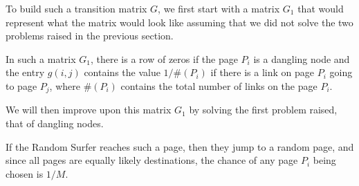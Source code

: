 \documentclass[pdftex,11pt,a4paper]{report}
\begin{document}
To build such a transition matrix $G$, we first start with a matrix $G_1$ that would represent
what the matrix would look like assuming that we did not solve the two problems raised in the
previous section. 


%

In such a matrix $G_1$, there is a row of zeros if the page $P_i$ is a dangling node
and the entry $g(i, j)$ contains the value $1 / \#(P_i)$ if there is
a link on page $P_i$ going to page $P_j$, where $\#(P_i)$ contains the total
number of links on the page $P_i$.

We will then improve upon this matrix $G_1$ by solving the first problem raised,
that of dangling nodes. 


If the Random Surfer reaches such a page, then they jump
to a random page, and since all pages are equally likely destinations, the chance
of any page $P_i$ being chosen is $1 / M$.
\end{document}
